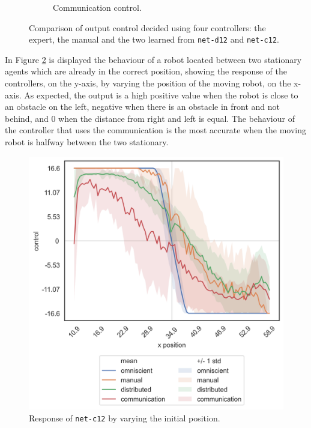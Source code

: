 \begin{figure}[!htb]
\begin{center}
\begin{subfigure}[h]{0.35\textwidth}
			\caption{Communication control.}
		\end{subfigure}
	\end{center}
	\vspace{-0.5cm}
	\caption[Evaluation of the control decided by \texttt{net-c12}.]{Comparison of 
	output control decided using four controllers: the expert, the manual and the 
	two learned from \texttt{net-d12} and \texttt{net-c12}.}
	\label{fig:net-c12control}
\end{figure}

In Figure \ref{fig:net-c12responseposition} is displayed the behaviour of a robot 
located between two stationary agents which are already in the correct position, 
showing the response of the controllers, on the y-axis, by varying the position of 
the moving robot, on the x-axis.  
As expected, the output is a high positive value when the robot is close to an 
obstacle on the left, negative when there is an obstacle in front and not behind, 
and $0$ when the distance from right and left is equal.
The behaviour of the controller that uses the communication is the most accurate 
when the moving robot is halfway between the two stationary.
\begin{figure}[!htb]
	\centering
	\includegraphics[width=.45\textwidth]{contents/images/net-c12/response-varying_init_position-communication}%
	\caption{Response of \texttt{net-c12} by varying the initial position.}
	\label{fig:net-c12responseposition}
\end{figure}

